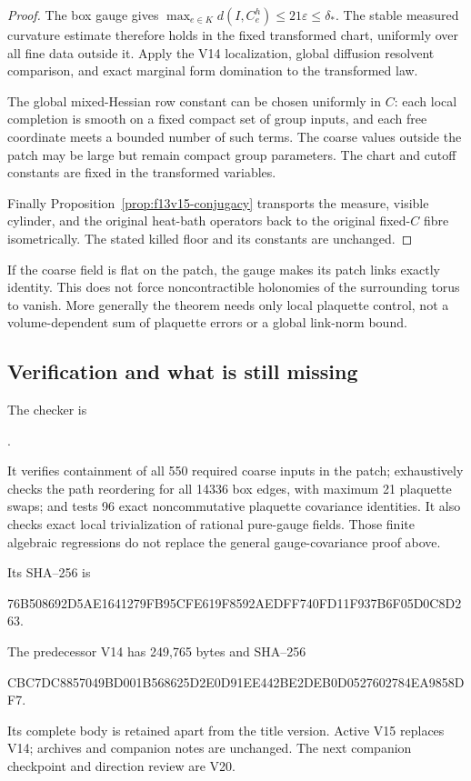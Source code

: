 \documentclass[11pt,oneside]{article}
\begin{document}
\begin{proof}
The box gauge gives
\(\max_{e\in K}d(I,C_e^h)
\le21\varepsilon\le\delta_*\).
The stable measured curvature
estimate therefore holds in
the fixed transformed chart,
uniformly over all fine data
outside it. Apply the V14
localization, global diffusion
resolvent comparison, and
exact marginal form domination
to the transformed law.

The global mixed-Hessian row
constant can be chosen uniformly
in \(C\): each local completion
is smooth on a fixed compact
set of group inputs, and each
free coordinate meets a bounded
number of such terms. The
coarse values outside the patch
may be large but remain compact
group parameters. The chart
and cutoff constants are fixed
in the transformed variables.

Finally
Proposition~\ref{prop:f13v15-conjugacy}
transports the measure, visible
cylinder, and the original
heat-bath operators back to
the original fixed-\(C\)
fibre isometrically. The
stated killed floor and
its constants are unchanged.
\end{proof}

If the coarse field is flat
on the patch, the gauge makes
its patch links exactly
identity. This does not
force noncontractible
holonomies of the surrounding
torus to vanish. More
generally the theorem needs
only local plaquette control,
not a volume-dependent sum
of plaquette errors or a
global link-norm bound.

\subsection{Verification and what is still missing}

The checker is
\begin{center}\small
{}.
\end{center}
It verifies containment of
all 550 required coarse inputs
in the patch; exhaustively
checks the path reordering
for all 14336 box edges,
with maximum 21 plaquette
swaps; and tests 96 exact
noncommutative plaquette
covariance identities.
It also checks exact local
trivialization of rational
pure-gauge fields. Those
finite algebraic regressions
do not replace the general
gauge-covariance proof above.

Its SHA--256 is
\begin{center}\scriptsize\ttfamily
76B508692D5AE1641279FB95CFE619F8592AEDFF740FD11F937B6F05D0C8D263.
\end{center}
The predecessor V14 has
249,765 bytes and SHA--256
\begin{center}\scriptsize\ttfamily
CBC7DC8857049BD001B568625D2E0D91EE442BE2DEB0D0527602784EA9858DF7.
\end{center}
Its complete body is retained
apart from the title version.
Active V15 replaces V14;
archives and companion notes
are unchanged. The next
companion checkpoint and
direction review are V20.
\end{document}
